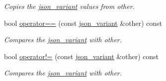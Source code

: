 \begin{DoxyCompactItemize}
\begin{DoxyCompactList}\small\item\em Copies the \hyperlink{classJSONLIB__NAMESPACE_1_1json__variant}{json\+\_\+variant} values from {\ttfamily other}. \end{DoxyCompactList}\item 
bool \hyperlink{classJSONLIB__NAMESPACE_1_1json__variant_aef1fc1a342cc170da06e0d3eb1299aad}{operator==} (const \hyperlink{classJSONLIB__NAMESPACE_1_1json__variant}{json\+\_\+variant} \&other) const
\begin{DoxyCompactList}\small\item\em Compares the \hyperlink{classJSONLIB__NAMESPACE_1_1json__variant}{json\+\_\+variant} with {\ttfamily other}. \end{DoxyCompactList}\item 
bool \hyperlink{classJSONLIB__NAMESPACE_1_1json__variant_a7672a255983f3142523b3680e737d021}{operator!=} (const \hyperlink{classJSONLIB__NAMESPACE_1_1json__variant}{json\+\_\+variant} \&other) const
\begin{DoxyCompactList}\small\item\em Compares the \hyperlink{classJSONLIB__NAMESPACE_1_1json__variant}{json\+\_\+variant} with {\ttfamily other}. \end{DoxyCompactList}\end{DoxyCompactItemize}
